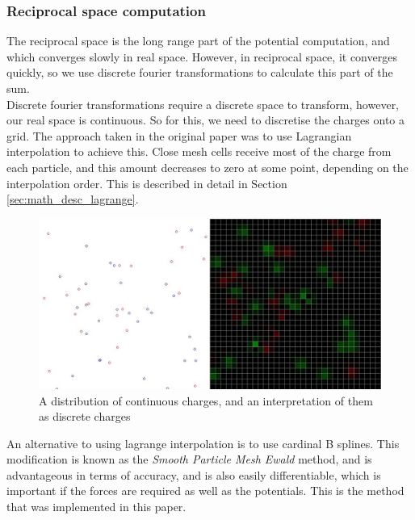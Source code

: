 \documentclass[pdftex,twoside,a4paper]{report}
\newcommand{\bcen}{\begin{center}}
\newcommand{\ecen}{\end{center}}
\begin{document}
\subsubsection{Reciprocal space computation}
The reciprocal space is the long range part of the potential computation, and which converges slowly in real space. However, in reciprocal space, it converges quickly, so we use discrete fourier transformations to calculate this part of the sum.\\

Discrete fourier transformations require a discrete space to transform, however, our real space is continuous. So for this, we need to discretise the charges onto a grid. The approach taken in the original paper was to use Lagrangian interpolation to achieve this. Close mesh cells receive most of the charge from each particle, and this amount decreases to zero at some point, depending on the interpolation order. This is described in detail in Section \ref{sec:math_desc_lagrange}.\\
\begin{figure}[H]
\bcen \includegraphics[width=\textwidth]{figures/Qarray.jpg} \ecen
\caption{A distribution of continuous charges, and an interpretation of them as discrete charges}
\end{figure}

An alternative to using lagrange interpolation is to use cardinal B splines. This modification is known as the \emph{Smooth Particle Mesh Ewald} method, and is advantageous in terms of accuracy, and is also easily differentiable, which is important if the forces are required as well as the potentials.  \cite{essmann:8577} This is the method that was implemented in this paper.
\end{document}
